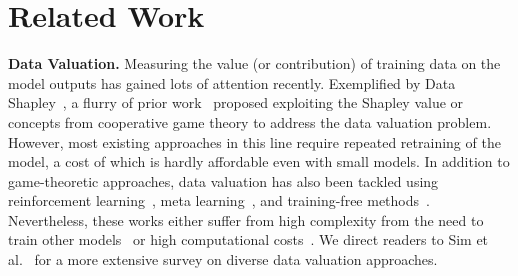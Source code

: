 \section{Related Work}
\label{sec:related}
\textbf{Data Valuation.\hspace{2.5mm}} Measuring the value (or contribution) of training data on the model outputs has gained lots of attention recently. Exemplified by Data Shapley~\cite{ghorbani2019data}, a flurry of prior work~\cite{jia2019towards,kwon2021beta,wang2023data} proposed exploiting the Shapley value or concepts from cooperative game theory to address the data valuation problem. However, most existing approaches in this line require repeated retraining of the model, a cost of which is hardly affordable even with small models. In addition to game-theoretic approaches, data valuation has also been tackled using reinforcement learning~\cite{yoon2020data}, meta learning~\cite{choe2024making}, and training-free methods~\cite{nohyun2023data,wu2022davinz}. Nevertheless, these works either suffer from high complexity from the need to train other models~\cite{choe2024making,yoon2020data} or high computational costs~\cite{nohyun2023data}. We direct readers to Sim et al.~\cite{sim2022data} for a more extensive survey on diverse data valuation approaches.


